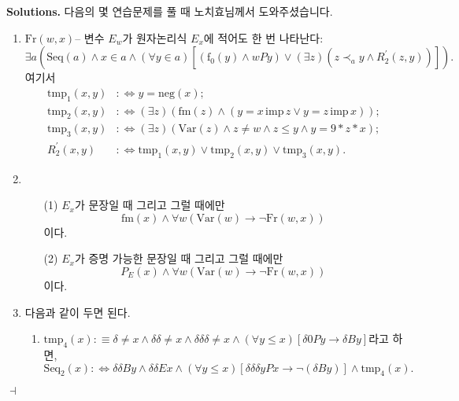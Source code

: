 \documentclass[12pt]{paper}
\newenvironment{context}[1][]
{ \noindent \textbf{{#1}.} }
{ \hfill $ \dashv $ }
\begin{document}
\begin{context}[Solutions]
다음의 몇 연습문제를 풀 때 노치효님께서 도와주셨습니다.
\begin{enumerate}
\item $\mathrm{Fr} \left( w , x \right)$--
변수 $E_w$가 원자논리식 $E_x$에 적어도 한 번 나타난다:
$$ \exists a \left( \mathrm{Seq} \left( a \right) \land x \in a \land \left( \forall y \in a \right) \left[ \left( \mathrm{f}_0 \left( y \right) \land w P y \right) \lor \left( \exists z \right) \left( z \prec_a y \land R_2^{\prime} \left( z , y \right) \right) \right] \right) . $$
여기서
\begin{align*}
\mathrm{tmp}_1 \left( x , y \right) & : \iff y = \mathrm{neg} \left( x \right) ; \\
\mathrm{tmp}_2 \left( x , y \right) & : \iff \left( \exists z \right) \left( \mathrm{fm} \left( z \right) \land \left( y = x \, \mathrm{imp} \, z \lor y = z \, \mathrm{imp} \, x \right) \right) ; \\
\mathrm{tmp}_3 \left( x , y \right) & : \iff \left( \exists z \right) \left( \mathrm{Var} \left( z \right) \land z \ne w \land z \le y \land y = 9 * z * x \right) ; \\
R_2^{\prime} \left( x , y \right) & : \iff \mathrm{tmp}_1 \left( x , y \right) \lor \mathrm{tmp}_2 \left( x , y \right) \lor \mathrm{tmp}_3 \left( x , y \right) .
\end{align*}
\item
\begin{enumerate}
\item [(1)] $E_x$가 문장일 때 그리고 그럴 때에만 $$\mathrm{fm} \left( x \right) \land \forall w \left( \mathrm{Var} \left( w \right) \rightarrow \lnot \mathrm{Fr} \left( w , x \right) \right)$$이다.
\item [(2)] $E_x$가 증명 가능한 문장일 때 그리고 그럴 때에만 $$P_E \left( x \right) \land \forall w \left( \mathrm{Var} \left( w \right) \rightarrow \lnot \mathrm{Fr} \left( w , x \right) \right)$$이다.
\end{enumerate}
\item 다음과 같이 두면 된다.
\begin{enumerate}
\item $\mathrm{tmp}_4 \left( x \right) : \equiv \delta \ne x \land \delta \delta \ne x \land \delta \delta \delta \ne x \land \left( \forall y \le x \right) \left[ \delta 0 P y \rightarrow \delta B y \right]$라고 하면,
$$ \mathrm{Seq}_2 \left( x \right) : \iff \delta \delta B y \land \delta \delta E x \land \left( \forall y \le x \right) \left[ \delta \delta \delta y P x \rightarrow \lnot \left( \delta B y \right) \right] \land \mathrm{tmp}_4 \left( x \right) . $$

\end{enumerate}
\end{enumerate}
\end{context}
\end{document}
